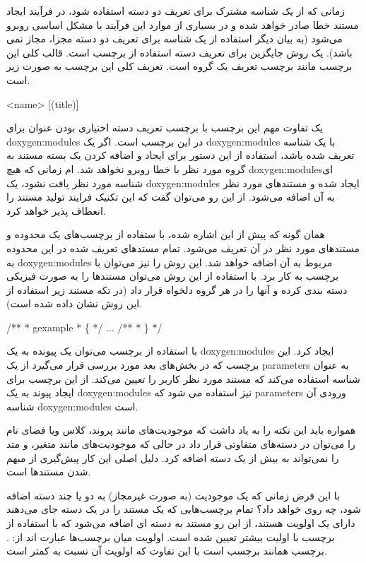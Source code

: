 زمانی که از یک شناسه مشترک برای تعریف دو دسته استفاده شود، در فرآیند ایجاد
مستند خطا صادر خواهد شده و در بسیاری از موارد این فرآیند با مشکل اساسی روبرو
می‌شود (به بیان دیگر استفاده از یک شناسه برای تعریف دو دسته
مجزا، مجاز نمی باشد). یک روش جایگزین برای تعریف دسته استفاده از برچسب
 است. قالب کلی این برچسب مانند برچسب تعریف یک گروه است. تعریف کلی
این برچسب به صورت زیر است.
\begin{C++}
\addtogroup <name> [(title)]
\end{C++}

یک تفاوت مهم این برچسب با برچسب تعریف دسته  اختیاری بودن عنوان برای \glspl{doxygen:module}
در این برچسب است. اگر یک \glspl{doxygen:module} با یک شناسه تعریف شده باشد، استفاده از این 
دستور برای ایجاد و اضافه کردن یک بسته مستند به گروه مورد نظر با خطا روبرو نخواهد شد.
ام زمانی که هیچ \glspl{doxygen:module}‌ای شناسه مورد نظر یافت نشود، یک \glspl{doxygen:module} ایجاد شده 
و مستندهای مورد نظر به آن اضافه می‌شود. از این رو می‌توان گفت که این تکنیک فرایند تولید
مستند را انعطاف پذیر خواهد کرد.

همان گونه که پیش از این اشاره شده، با ستفاده از برچسب‌های \lr{ \ \{ \ \}} یک محدوده
و مستندهای مورد نظر در آن تعریف می‌شود. تمام مستد‌های تعریف شده در این محدوده به \glspl{doxygen:module} 
مربوط به آن اضافه خواهد شد. این روش را نیز می‌توان با برچسب  به کار برد.
با استفاده از این روش می‌توان مستندها را به صورت فیزیکی دسته بندی کرده و آنها را در
هر گروه دلخواه قرار داد (در تکه مستند زیر استفاده از این روش نشان داده شده است).

\begin{C++}
/**
 * \addtogroup gexample
 * \{
 */
...
/**
 * \}
 */
\end{C++}

با استفاده از برچسب  می‌توان یک پیونده به یک \glspl{doxygen:module} ایجاد کرد. این برچسب که در بخش‌های
بعد مورد بررسی قرار می‌گیرد از یک \glspl{parameter} به عنوان شناسه استفاده می‌کند که مستند مورد نظر
کاربر را تعیین می‌کند. از این برچسب برای ایجاد پیوند به یک \glspl{doxygen:module} نیز استفاده می شود
که \glspl{parameter} ورودی آن شناسه \glspl{doxygen:module} است.

\begin{note}
همواره باید این نکته را به یاد داشت که موجودیت‌های مانند پروند، کلاس ویا فضای
نام را می‌توان در دسته‌های متفاوتی قرار داد در حالی که موجودیت‌های مانند
متغیر، و متد را نمی‌تواند به بیش از یک دسته اضافه کرد. دلیل اصلی این کار پیش‌گیری از
مبهم شدن مستندها است.

با این فرض زمانی که یک موجودیت (به صورت غیرمجاز) به دو یا چند دسته اضافه شود، چه
روی خواهد داد؟ تمام برچسب‌هایی که یک مستند را در یک دسته جای می‌دهند دارای یک
اولویت هستند، از این رو مستند به دسته ای اضافه می‌شود که با استفاده از برچسب با
اولیت بیشتر تعیین شده است. اولویت میان برچسب‌ها عبارت اند از: 
   .
برچسب  همانند برچسب  است با این تفاوت که اولویت آن
نسبت به  کمتر است.

\end{note}

